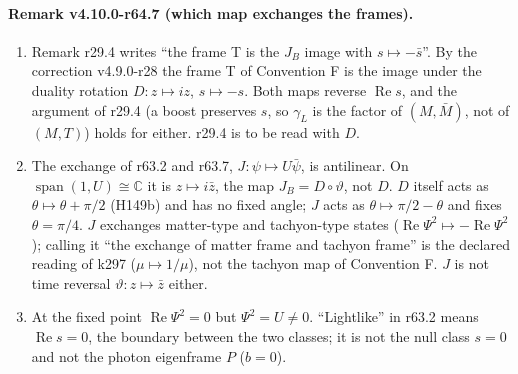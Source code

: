 \paragraph{Remark v4.10.0-r64.7 (which map exchanges the frames).}
\begin{enumerate}[leftmargin=2em]
\item[(a)] Remark r29.4 writes ``the frame T is the \(J_B\) image with \(s\mapsto-\bar s\)''.  By the correction v4.9.0-r28 the frame T of
Convention F is the image under the duality rotation \(D\colon z\mapsto iz\), \(s\mapsto-s\).  Both maps reverse \(\operatorname{Re}s\), and the
argument of r29.4 (a boost preserves \(s\), so \(\gamma_L\) is the factor of \((M,\bar M)\), not of \((M,T)\)) holds for either.  r29.4 is to be
read with \(D\).
\item[(b)] The exchange of r63.2 and r63.7, \(J\colon\psi\mapsto U\bar\psi\), is antilinear.  On \(\operatorname{span}(1,U)\cong\mathbb C\) it is
\(z\mapsto i\bar z\), the map \(J_B=D\circ\vartheta\), not \(D\).  \(D\) itself acts as \(\theta\mapsto\theta+\pi/2\) (H149b) and has no fixed
angle; \(J\) acts as \(\theta\mapsto\pi/2-\theta\) and fixes \(\theta=\pi/4\).  \(J\) exchanges matter-type and tachyon-type states
(\(\operatorname{Re}\Psi^2\mapsto-\operatorname{Re}\Psi^2\)); calling it ``the exchange of matter frame and tachyon frame'' is the declared
reading of k297 (\(\mu\mapsto1/\mu\)), not the tachyon map of Convention F.  \(J\) is not time reversal \(\vartheta\colon z\mapsto\bar z\) either.
\item[(c)] At the fixed point \(\operatorname{Re}\Psi^2=0\) but \(\Psi^2=U\ne0\).  ``Lightlike'' in r63.2 means \(\operatorname{Re}s=0\), the
boundary between the two classes; it is not the null class \(s=0\) and not the photon eigenframe \(P\) (\(b=0\)).
\end{enumerate}

